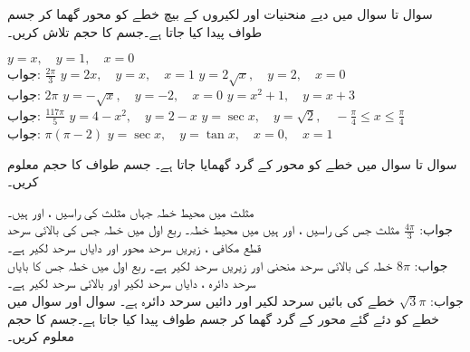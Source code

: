 سوال  تا سوال  میں دیے منحنیات اور لکیروں کے بیچ خطے کو  محور گھما کر جسم طواف پیدا کیا جاتا ہے۔جسم کا حجم تلاش کریں۔

$y=x,\quad y=1,\quad x=0$\\
جواب:\quad
$\tfrac{2\pi}{3}$
$y=2x,\quad y=x,\quad x=1$
$y=2\sqrt{x},\quad y=2,\quad x=0$\\
جواب:\quad
$2\pi$
$y=-\sqrt{x},\quad y=-2,\quad x=0$
$y=x^2+1,\quad y=x+3$\\
جواب:\quad
$\tfrac{117\pi}{5}$
$y=4-x^2,\quad y=2-x$
$y=\sec x,\quad y=\sqrt{2},\quad -\tfrac{\pi}{4}\le x \le \tfrac{\pi}{4}$\\
جواب:\quad
$\pi(\pi-2)$
$y=\sec x,\quad y=\tan x,\quad x=0,\quad x=1$

سوال  تا سوال  میں خطے کو  محور کے گرد گھمایا جاتا ہے۔ جسم طواف کا حجم معلوم کریں۔

مثلث میں محیط خطہ جہاں مثلث کی  راسیں ،  اور  ہیں۔ \\
جواب:\quad
$\tfrac{4\pi}{3}$
مثلث جس کی  راسیں ،  اور  ہیں میں محیط خطہ۔ 
ربع اول میں خطہ جس کی بالائی سرحد قطع مکافی ، زیریں سرحد محور  اور دایاں سرحد لکیر  ہے۔\\
جواب:\quad
$8\pi$
خطہ کی بالائی سرحد منحنی  اور زیریں سرحد لکیر  ہے۔ 
ربع اول میں خطہ جس کا بایاں سرحد دائرہ ، دایاں سرحد لکیر  اور بالائی سرحد لکیر  ہے۔\\
جواب:\quad
$\sqrt{3}\pi$
خطے کی بائیں سرحد لکیر اور دائیں سرحد دائرہ  ہے۔
سوال  اور سوال  میں خطے کو دئے گئے محور کے گرد گھما کر جسم طواف پیدا کیا جاتا ہے۔جسم کا حجم معلوم کریں۔


